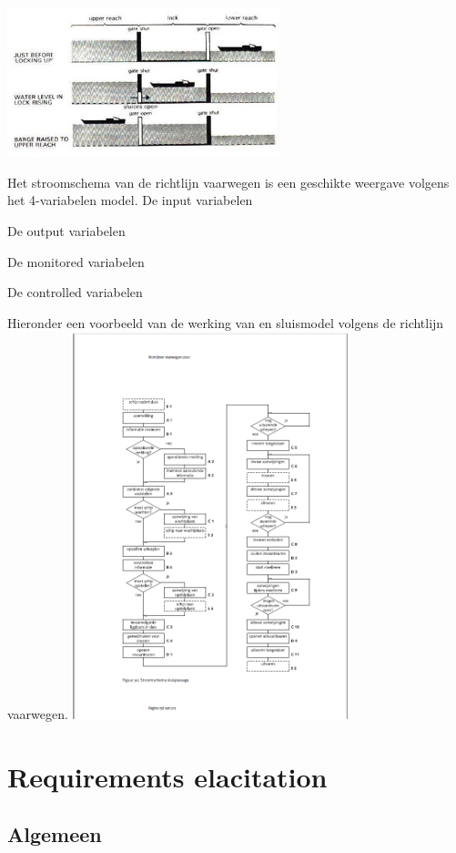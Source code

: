 \documentclass{article}
\begin{document}
 
	\includegraphics[width=8cm]{sluismodel.jpg} %
	
 Het stroomschema van de richtlijn vaarwegen is een geschikte weergave volgens het 4-variabelen model.
 De input variabelen
 
 De output variabelen
 
 De monitored variabelen
 
 De controlled variabelen
 
 
		Hieronder een voorbeeld van de werking van en sluismodel volgens de richtlijn vaarwegen.
	\includegraphics[width=8cm]{sluispassage.png} %

 
	
	\section{Requirements elacitation}
	
	\subsection{Algemeen}
	
\end{document}
